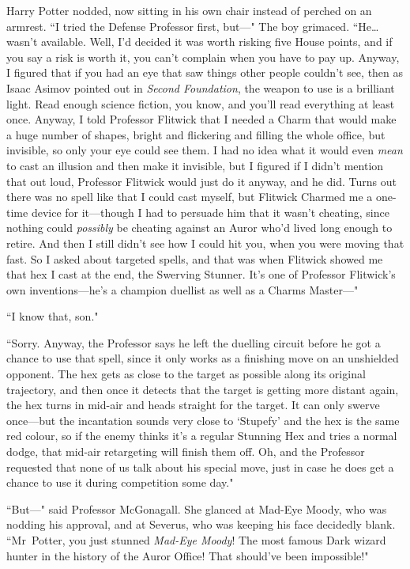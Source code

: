 Harry Potter nodded, now sitting in his own chair instead of perched on an armrest. ``I tried the Defense Professor first, but—" The boy grimaced. ``He{\ldots} wasn't available. Well, I'd decided it was worth risking five House points, and if you say a risk is worth it, you can't complain when you have to pay up. Anyway, I figured that if you had an eye that saw things other people couldn't see, then as Isaac Asimov pointed out in \emph{Second Foundation}, the weapon to use is a brilliant light. Read enough science fiction, you know, and you'll read everything at least once. Anyway, I told Professor Flitwick that I needed a Charm that would make a huge number of shapes, bright and flickering and filling the whole office, but invisible, so only your eye could see them. I had no idea what it would even \emph{mean} to cast an illusion and then make it invisible, but I figured if I didn't mention that out loud, Professor Flitwick would just do it anyway, and he did. Turns out there was no spell like that I could cast myself, but Flitwick Charmed me a one-time device for it—though I had to persuade him that it wasn't cheating, since nothing could \emph{possibly} be cheating against an Auror who'd lived long enough to retire. And then I still didn't see how I could hit you, when you were moving that fast. So I asked about targeted spells, and that was when Flitwick showed me that hex I cast at the end, the Swerving Stunner. It's one of Professor Flitwick's own inventions—he's a champion duellist as well as a Charms Master—"

``I know that, son."

``Sorry. Anyway, the Professor says he left the duelling circuit before he got a chance to use that spell, since it only works as a finishing move on an unshielded opponent. The hex gets as close to the target as possible along its original trajectory, and then once it detects that the target is getting more distant again, the hex turns in mid-air and heads straight for the target. It can only swerve once—but the incantation sounds very close to `Stupefy' and the hex is the same red colour, so if the enemy thinks it's a regular Stunning Hex and tries a normal dodge, that mid-air retargeting will finish them off. Oh, and the Professor requested that none of us talk about his special move, just in case he does get a chance to use it during competition some day."

``But—" said Professor McGonagall. She glanced at Mad-Eye Moody, who was nodding his approval, and at Severus, who was keeping his face decidedly blank. ``Mr~Potter, you just stunned \emph{Mad-Eye Moody}! The most famous Dark wizard hunter in the history of the Auror Office! That should've been impossible!"

